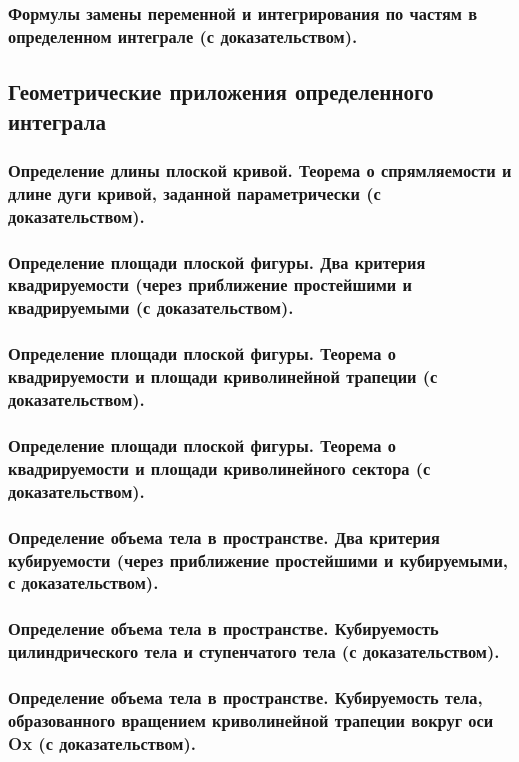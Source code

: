 \documentclass[10pt]{article}
\begin{document}
    \subsubsection{Формулы замены переменной и интегрирования по частям в определенном интеграле (с доказательством).}
    \subsection{Геометрические приложения определенного интеграла}
    \subsubsection{Определение длины плоской кривой. Теорема о спрямляемости и длине дуги кривой, заданной параметрически (с доказательством).}
    \subsubsection{Определение площади плоской фигуры. Два критерия квадрируемости (через приближение простейшими и квадрируемыми (с доказательством).}
    \subsubsection{Определение площади плоской фигуры. Теорема о квадрируемости и площади криволинейной трапеции (с доказательством).}
    \subsubsection{Определение площади плоской фигуры. Теорема о квадрируемости и площади криволинейного сектора (с доказательством).}
    \subsubsection{Определение объема тела в пространстве. Два критерия кубируемости (через приближение простейшими и кубируемыми, с доказательством).}
    \subsubsection{Определение объема тела в пространстве. Кубируемость цилиндрического тела и ступенчатого тела (с доказательством).}
    \subsubsection{Определение объема тела в пространстве. Кубируемость тела, образованного вращением криволинейной трапеции вокруг оси Ox (с доказательством).}
\end{document}
